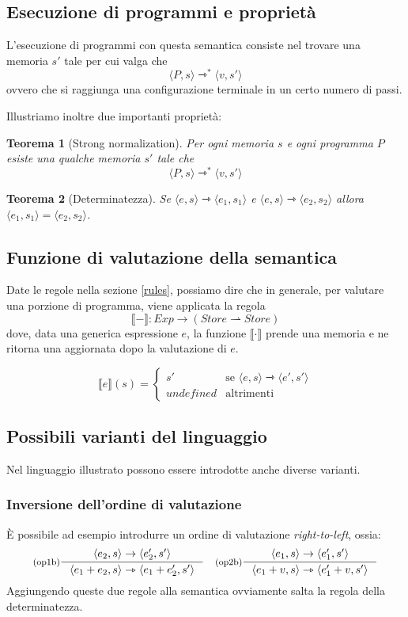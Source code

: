 \documentclass[a4paper, 11pt]{article}
\newtheorem{thm}{Teorema}[section]
\newcommand{\sem}[1]{\llbracket #1 \rrbracket}
\begin{document}
\subsection{Esecuzione di programmi e proprietà}
L'esecuzione di programmi con questa semantica consiste nel trovare una memoria $s'$ tale per cui valga che \[ \langle P, s \rangle \rightarrowtriangle^\ast \langle v, s' \rangle \] ovvero che si raggiunga una configurazione terminale in un certo numero di passi.

Illustriamo inoltre due importanti proprietà:
\begin{thm}[Strong normalization]
	Per ogni memoria $s$ e ogni programma $P$  esiste una qualche memoria $s'$ tale che \[ \langle P,s \rangle \rightarrowtriangle^\ast \langle v,s' \rangle  \]
\end{thm}

\begin{thm}[Determinatezza]
	Se $\langle e,s \rangle  \rightarrowtriangle \langle e_1, s_1 \rangle $ e $\langle e,s \rangle  \rightarrowtriangle \langle e_2, s_2 \rangle $ allora $\langle e_1, s_1 \rangle = \langle e_2, s_2 \rangle$.
\end{thm}

\subsection{Funzione di valutazione della semantica}
Date le regole nella sezione \ref{rules}, possiamo dire che in generale, per valutare una porzione di programma, viene applicata la regola \[ \sem{-}: Exp \to (Store \rightharpoonup Store) \]
dove, data una generica espressione $e$, la funzione $\sem{ \cdot}$ prende una memoria e ne ritorna una aggiornata dopo la valutazione di $e$.

\[ \sem{e}(s) = \begin{cases}
s' &\text{se } \langle e,s \rangle \rightarrowtriangle \langle e',s' \rangle \\
undefined &\text{altrimenti}
\end{cases} \]

\subsection{Possibili varianti del linguaggio}
Nel linguaggio illustrato possono essere introdotte anche diverse varianti.

\subsubsection{Inversione dell'ordine di valutazione}
È possibile ad esempio introdurre un ordine di valutazione \textit{right-to-left}, ossia:
\begin{align*}
	&\inference[(op1b)]{\langle e_2,s \rangle \to \langle e_2', s' \rangle}{\langle e_1 + e_2, s \rangle \rightarrowtriangle \langle e_1 + e_2', s' \rangle}
	&\inference[(op2b)]{\langle e_1,s \rangle \to \langle e_1', s' \rangle}{\langle e_1 + v, s \rangle \rightarrowtriangle \langle e_1' + v, s' \rangle}
\end{align*}
Aggiungendo queste due regole alla semantica ovviamente salta la regola della determinatezza.
\end{document}
